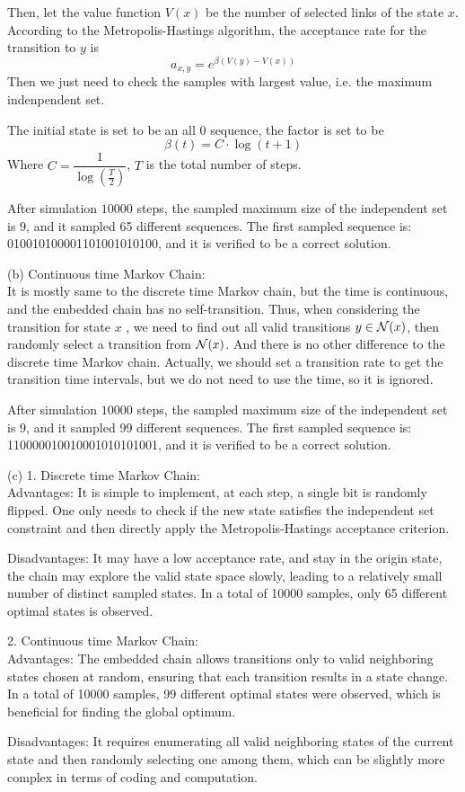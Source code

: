 \begin{homeworkProblem}
Then, let the value function $V(x)$ be the number of selected links of the state $x$. According to the Metropolis-Hastings algorithm, the acceptance rate for the transition to $y$ is
$$a_{x,y}=e^{\beta\left(V(y)-V(x)\right)}$$
Then we just need to check the samples with largest value, i.e. the maximum indenpendent set.

The initial state is set to be an all 0 sequence, the factor is set to be
$$\beta(t)=C\cdot \log(t+1)$$
Where $C=\dfrac{1}{\log\left(\frac{T}{2}\right)}$, $T$ is the total number of steps.

After simulation $10000$ steps, the sampled maximum size of the independent set is $9$, and it sampled 65 different sequences. The first sampled sequence is: 010010100001101001010100, and it is verified to be a correct solution.

(b) Continuous time Markov Chain: \\
It is mostly same to the discrete time Markov chain, but the time is continuous, and the embedded chain has no self-transition. Thus, when considering the transition for state $x$ , we need to find out all valid transitions $y\in\mathcal{N}(x)$, then randomly select a transition from $\mathcal{N}(x)$. And there is no other difference to the discrete time Markov chain. Actually, we should set a transition rate to get the transition time intervals, but we do not need to use the time, so it is ignored.

After simulation $10000$ steps, the sampled maximum size of the independent set is $9$, and it sampled 99 different sequences. The first sampled sequence is: 110000010010001010101001, and it is verified to be a correct solution.

(c) 1. Discrete time Markov Chain: \\
Advantages: It is simple to implement, at each step, a single bit is randomly flipped. One only needs to check if the new state satisfies the independent set constraint and then directly apply the Metropolis-Hastings acceptance criterion.

Disadvantages: It may have a low acceptance rate, and stay in the origin state, the chain may explore the valid state space slowly, leading to a relatively small number of distinct sampled states. In a total of 10000 samples, only 65 different optimal states is observed.

2. Continuous time Markov Chain: \\
Advantages: The embedded chain allows transitions only to valid neighboring states chosen at random, ensuring that each transition results in a state change. In a total of 10000 samples, 99 different optimal states were observed, which is beneficial for finding the global optimum.

Disadvantages: It requires enumerating all valid neighboring states of the current state and then randomly selecting one among them, which can be slightly more complex in terms of coding and computation.

\end{homeworkProblem}

\newpage